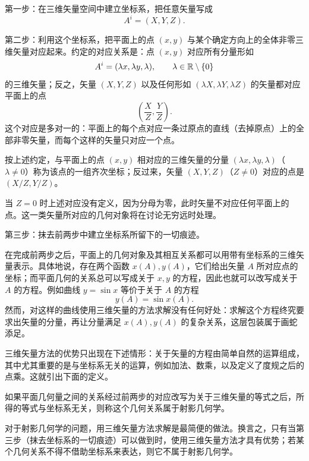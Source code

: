 第一步：在三维矢量空间中建立坐标系，把任意矢量写成
\[
A^i=(X,Y,Z).
\]

第二步：利用这个坐标系，把平面上的点 $(x,y)$ 与某个确定方向上的全体非零三维矢量对应起来。约定的对应关系是：点 $(x,y)$ 对应所有分量形如
\[
A^i=(\lambda x,\lambda y,\lambda),\qquad \lambda\in\mathbb{R}\setminus\{0\}
\]
的三维矢量；反之，矢量 $(X,Y,Z)$ 以及任何形如 $(\lambda X,\lambda Y,\lambda Z)$ 的矢量都对应平面上的点
\[
\left(\frac{X}{Z},\frac{Y}{Z}\right).
\]
这个对应是多对一的：平面上的每个点对应一条过原点的直线（去掉原点）上的全部非零矢量，而每个这样的矢量只对应一个点。

\begin{definition}[齐次坐标]
按上述约定，与平面上的点 $(x,y)$ 相对应的三维矢量的分量 $(\lambda x,\lambda y,\lambda)$（$\lambda\neq 0$）称为该点的一组齐次坐标；反过来，矢量 $(X,Y,Z)$（$Z\neq 0$）对应的点是 $(X/Z,Y/Z)$。
\end{definition}

当 $Z=0$ 时上述对应没有定义，因为分母为零，此时矢量不对应任何平面上的点。这一类矢量所对应的几何对象将在讨论无穷远时处理。

第三步：抹去前两步中建立坐标系所留下的一切痕迹。

在完成前两步之后，平面上的几何对象及其相互关系都可以用带有坐标系的三维矢量表示。具体地说，存在两个函数 $x(A),y(A)$，它们给出矢量 $A$ 所对应点的坐标；而平面几何的关系总可以写成关于 $x,y$ 的方程，因此也就可以改写成关于 $A$ 的方程。例如曲线 $y=\sin x$ 等价于关于 $A$ 的方程
\[
y(A)=\sin x(A).
\]
然而，对这样的曲线使用三维矢量的方法求解没有任何好处：求解这个方程终究要求出矢量的分量，再让分量满足 $x(A),y(A)$ 的复杂关系，这层包装属于画蛇添足。

三维矢量方法的优势只出现在下述情形：关于矢量的方程由简单自然的运算组成，其中尤其重要的是与坐标系无关的运算，例如加法、数乘，以及定义了度规之后的点乘。这就引出下面的定义。

\begin{definition}[射影几何学]
如果平面几何量之间的关系经过前两步的对应改写为关于三维矢量的等式之后，所得的等式与坐标系无关，则称这个几何关系属于射影几何学。
\end{definition}

对于射影几何学的问题，用三维矢量方法求解是最简便的做法。换言之，只有当第三步（抹去坐标系的一切痕迹）可以做到时，使用三维矢量方法才具有优势；若某个几何关系不得不借助坐标系来表达，则它不属于射影几何学。
